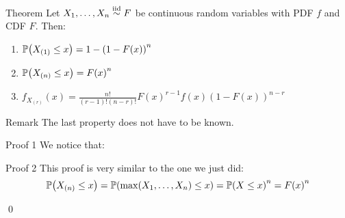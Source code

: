 \documentclass[a4paper]{article}
\begin{document}
\begin{parag}{Theorem}
    Let $X_1, \ldots, X_n \overset{\text{iid}}{\sim} F$ be continuous random variables with PDF $f$ and CDF $F$. Then:
    \begin{enumerate}
        \item $\prob\left(X_{\left(1\right)} \leq x\right) = 1 - \left(1 - F\left(x\right)\right)^n$
        \item $\prob\left(X_{\left(n\right)} \leq x\right) = F\left(x\right)^n$
        \item $f_{X_{\left(r\right)}}\left(x\right) = \frac{n!}{\left(r-1\right)!\left(n-r\right)!} F\left(x\right)^{r-1} f\left(x\right)\left(1 - F\left(x\right)\right)^{n-r}$
    \end{enumerate}
    
    \begin{subparag}{Remark}
        The last property does not have to be known.
    \end{subparag}
    
    \begin{subparag}{Proof 1}
        We notice that: 
        
    \end{subparag}

    \begin{subparag}{Proof 2}
        This proof is very similar to the one we just did: 
        \[\prob\left(X_{\left(n\right)} \leq x\right) = \prob\left(\max\left(X_1, \ldots, X_n\right) \leq x\right) = \prob\left(X \leq x\right)^n = F\left(x\right)^n\]

        \qed
    \end{subparag}
\end{parag}
\end{document}
